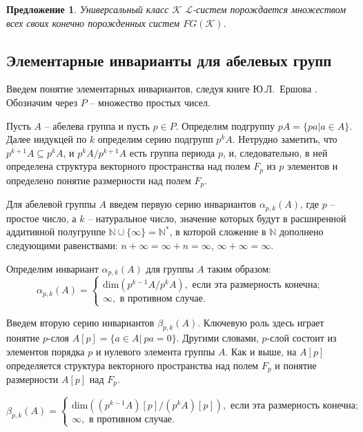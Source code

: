 \documentclass[a4paper,11pt,twoside]{article}
\newtheorem{proposition}{Предложение}[section]
\def\K{{\mathcal{K}}}
\def\L{{\mathcal{L}}}
\def\N{{\mathbb{N}}}
\begin{document}
\begin{proposition}\label{prop:ClassGeneratesFinetObjects}
Универсальный класс $\K$ $\L$-систем порождается множеством всех своих конечно порожденных систем $FG(\K)$.
\end{proposition}

\subsection{Элементарные инварианты для абелевых групп}\label{sec:UnivInvariants}

Введем понятие элементарных инвариантов, следуя книге Ю.Л.~Ершова \cite{Ershov}. Обозначим через $P$ -- множество простых чисел.

Пусть $A$ -- абелева группа и пусть $p \in P$. Определим подгруппу $pA = \{ pa | a \in A\}$. Далее индукцей по $k$ определим серию подгрупп $p^k A$. Нетрудно заметить, что $p^{k+1} A \subseteq p^k A$, и $p^k A \Big/ p^{k+1} A$ есть группа периода $p$, и, следовательно, в ней определена структура векторного пространства над полем $F_p$ из $p$ элементов и определено понятие размерности над полем $F_p$.

Для абелевой группы $A$ введем первую серию инвариантов $\alpha_{p,k}(A)$, где $p$ -- простое число, а $k$ -- натуральное число, значение которых будут в расширенной аддитивной полугруппе $\N \cup \{\infty \} = \N^*$, в которой сложение в $\N$ дополнено следующими равенствами: $n + \infty = \infty + n = \infty$, $\infty + \infty = \infty$.

Определим инвариант $\alpha_{p,k}(A)$ для группы $A$ таким образом:
$$\alpha_{p,k}(A) = \left\lbrace 
\begin{array}{l}  
\mathrm{dim} \left( p^{k-1}A \Big/ p^k A \right), \text{ если эта размерность конечна;} \\ 
\infty, \text{ в противном случае.}
\end{array} 
\right.$$

Введем вторую серию инвариантов $\beta_{p,k}(A)$. Ключевую роль здесь играет понятие $p$-слоя $A[p] = \{a \in A | \ pa = 0\}$. Другими словами, $p$-слой состоит из элементов порядка $p$ и нулевого элемента группы $A$. Как и выше, на $A[p]$ определяется структура векторного пространства над полем $F_p$ и понятие размерности $A[p]$ над $F_p$.

$$\beta_{p,k}(A) = \left\lbrace 
\begin{array}{l}  
\mathrm{dim} \left( (p^{k-1}A) [p] \Big/ (p^k A) [p] \right), \text{ если эта размерность конечна;} \\ 
\infty, \text{ в противном случае.}
\end{array} 
\right.$$
\end{document}
